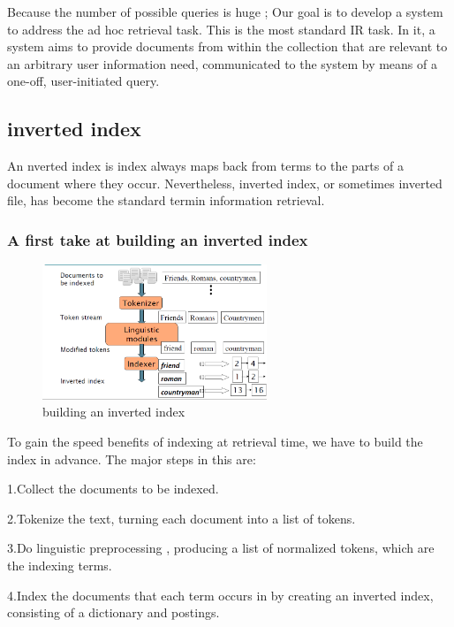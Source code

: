 Because the number of possible queries is huge ; Our goal is to develop a system to address the ad hoc retrieval task. This is the most standard IR task. In it, a system aims to provide documents from within the collection that are relevant to an arbitrary user information need, communicated to the system by means of a one-off, user-initiated query.


\subsection{inverted index}

An nverted index is index always maps back from terms to the parts of a document where they occur. Nevertheless, inverted index, or sometimes inverted file, has become the standard termin information retrieval.
 
\subsubsection{A first take at building an inverted index}

\begin{figure}[H]%
    \center%
    \includegraphics[width=0.6\textwidth]{images/shimaa/building an inverted index.png}
    \caption[This is building an inverted index]{building an inverted index}\label{fig:building an inverted index}%
 \end{figure}
 
To gain the speed benefits of indexing at retrieval time, we have to build the
index in advance. The major steps in this are:

1.Collect the documents to be indexed.

2.Tokenize the text, turning each document into a list of tokens.

3.Do linguistic preprocessing , producing a list of normalized tokens, which
  are the indexing terms.
  
4.Index the documents that each term occurs in by creating an inverted index,
  consisting of a dictionary and postings.

